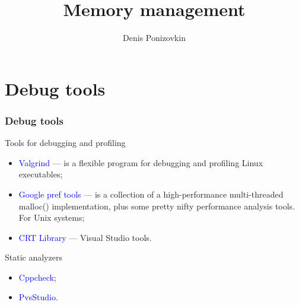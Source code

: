 \documentclass[10pt,xcolor={usenames,dvipsnames}]{beamer}
\begin{document}
\title{Memory management}   
\author{Denis Ponizovkin} 

\institute[<EPAM>]

\frame{\titlepage} 






\section{Debug tools}
\begin{frame}[fragile]
	\frametitle{Debug tools}
	\begin{exampleblock}{Tools for debugging and profiling}
	\begin{itemize}
		\item \textcolor{blue}{Valgrind} --- is a flexible program for debugging and profiling Linux executables;
		\item \textcolor{blue}{Google pref tools} --- is a collection of a high-performance multi-threaded malloc()
			implementation, plus some pretty nifty performance analysis tools. For Unix systems;
		\item \textcolor{blue}{CRT Library} --- Visual Studio tools.
	\end{itemize}
	\end{exampleblock}

	\begin{exampleblock}{Static analyzers}
	\begin{itemize}
		\item \textcolor{blue}{Cppcheck};
		\item \textcolor{blue}{PvsStudio}.
	\end{itemize}
	\end{exampleblock}
\end{frame}
\end{document}
